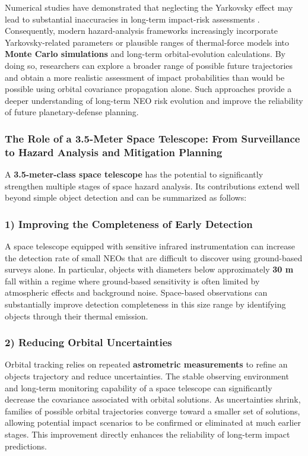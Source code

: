 Numerical studies have demonstrated that neglecting the Yarkovsky effect may lead to substantial inaccuracies in long-term impact-risk assessments \cite{vokrouhlicky2015}. Consequently, modern hazard-analysis frameworks increasingly incorporate Yarkovsky-related parameters or plausible ranges of thermal-force models into \textbf{Monte Carlo simulations} and long-term orbital-evolution calculations. By doing so, researchers can explore a broader range of possible future trajectories and obtain a more realistic assessment of impact probabilities than would be possible using orbital covariance propagation alone. Such approaches provide a deeper understanding of long-term NEO risk evolution and improve the reliability of future planetary-defense planning.

\subsubsection{The Role of a 3.5-Meter Space Telescope: From Surveillance to Hazard Analysis and Mitigation Planning}

A \textbf{3.5-meter-class space telescope} has the potential to significantly strengthen multiple stages of space hazard analysis. Its contributions extend well beyond simple object detection and can be summarized as follows:

\subsubsection{1) Improving the Completeness of Early Detection}\label{improving-the-completeness-of-early-detection}

A space telescope equipped with sensitive infrared instrumentation can increase the detection rate of small NEOs that are difficult to discover using ground-based surveys alone. In particular, objects with diameters below approximately \textbf{30 m} fall within a regime where ground-based sensitivity is often limited by atmospheric effects and background noise. Space-based observations can substantially improve detection completeness in this size range by identifying objects through their thermal emission.

\subsubsection{2) Reducing Orbital Uncertainties}\label{reducing-orbital-uncertainties}

Orbital tracking relies on repeated \textbf{astrometric measurements} to refine an object\textquotesingle s trajectory and reduce uncertainties. The stable observing environment and long-term monitoring capability of a space telescope can significantly decrease the covariance associated with orbital solutions. As uncertainties shrink, families of possible orbital trajectories converge toward a smaller set of solutions, allowing potential impact scenarios to be confirmed or eliminated at much earlier stages. This improvement directly enhances the reliability of long-term impact predictions.

